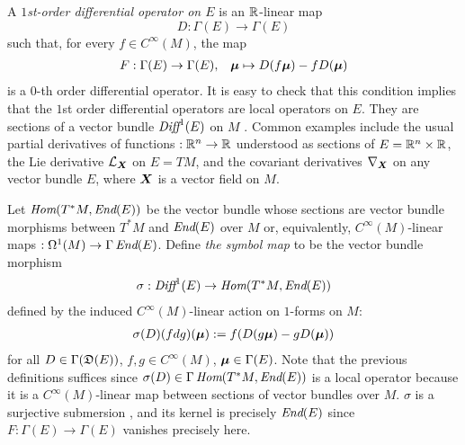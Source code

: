 A \emph{$1$st-order differential operator on $E$} is an $\mathbb{R}$-linear map 
\[
    D: \Gamma(E) \to \Gamma(E)
\]
such that, for every $f \in C^\infty(M)$, the map
\begin{align*}
    F: \Gamma(E) \to \Gamma(E), && \bm{\mu} \mapsto D(f \bm{\mu}) - f D(\bm{\mu})
\end{align*}
is a $0$-th order differential operator. It is easy to check that this condition implies that the $1$st order differential operators are local operators on $E$. They are sections of a vector bundle $\operatorname{\textit{Diff}}^1(E)$ on $M$ \cite{Mackenzie2005}%
. Common examples include the usual partial derivatives of functions $:\mathbb{R}^n \to \mathbb{R}$ understood as sections of $E = \mathbb{R}^n \times \mathbb{R}$, the Lie derivative $\mathcal L_{\bm{X}}$ on $E = TM$, and the covariant derivatives $\nabla_{\bm{X}}$ on any vector bundle $E$, where $\bm{X}$ is a vector field on $M$.

Let $\operatorname{\textit{Hom}}(T^*M, \operatorname{\textit{End}}(E))$ be the vector bundle whose sections are vector bundle morphisms between $T^* M$ and $\operatorname{\textit{End}}(E)$ over $M$ or, equivalently, $C^\infty(M)$-linear maps $:\Omega^1(M) \to \Gamma\operatorname{\textit{End}}(E)$. Define \emph{the symbol map} to be the vector bundle morphism
\begin{align*}
    \sigma: \operatorname{\textit{Diff}}^1(E) \to \operatorname{\textit{Hom}}(T^*M, \operatorname{\textit{End}}(E)) 
\end{align*}
defined by the induced $C^\infty(M)$-linear action on $1$-forms on $M$:
\begin{align*}
    \sigma(D)(fdg)(\bm{\mu}) := f (D(g \bm{\mu}) - g D(\bm{\mu}))
\end{align*}
for all $D \in \Gamma(\mathfrak{D}(E))$, $f, g \in C^\infty(M)$, $\bm{\mu} \in \Gamma(E)$.
Note that the previous definitions suffices since $\sigma(D) \in \Gamma\operatorname{\textit{Hom}}(T^*M, \operatorname{\textit{End}}(E))$ is a local operator because it is a $C^\infty(M)$-linear map between sections of vector bundles over $M$. $\sigma$ is a surjective submersion \cite{Mackenzie2005}, and its kernel is precisely $\operatorname{\textit{End}}(E)$ since $F:\Gamma(E) \to \Gamma(E)$ vanishes precisely here.

